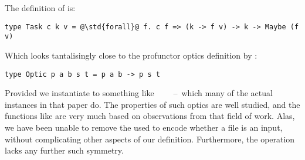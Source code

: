 The definition of  is:

\begin{verbatim}
type Task c k v = @\std{forall}@ f. c f => (k -> f v) -> k -> Maybe (f v)
\end{verbatim}

\noindent
Which looks tantalisingly close to the profunctor optics definition by
\cite{pickering2017profunctor}:

\begin{verbatim}
type Optic p a b s t = p a b -> p s t
\end{verbatim}

Provided we instantiate  to something like
~\hs{->}~~~--~which many of the actual instances in that paper
do. The properties of such optics are well studied, and the functions like
 are very much based on observations from that field of work.
Alas, we have been unable to remove the  used to encode whether a file
is an input, without complicating other aspects of our definition. Furthermore,
the  operation lacks any further such symmetry.
